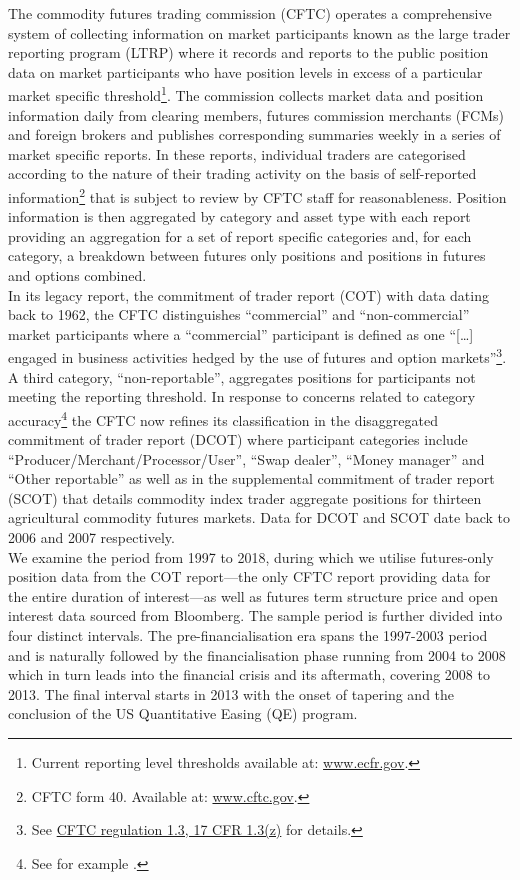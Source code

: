\documentclass[
  authoryear,
  preprint,
  3p]{elsarticle}
\begin{document}
The commodity futures trading commission (CFTC) operates a comprehensive
system of collecting information on market participants known as the
large trader reporting program (LTRP) where it records and reports to
the public position data on market participants who have position levels
in excess of a particular market specific threshold\footnote{Current
  reporting level thresholds available at:
  \href{https://www.ecfr.gov/cgi-bin/retrieveECFR?gp=&SID=970471b8455f4bab7db4110cfde50731&mc=true&r=SECTION&n=se17.1.15_103}{www.ecfr.gov}.}.
The commission collects market data and position information daily from
clearing members, futures commission merchants (FCMs) and foreign
brokers and publishes corresponding summaries weekly in a series of
market specific reports. In these reports, individual traders are
categorised according to the nature of their trading activity on the
basis of self-reported information\footnote{CFTC form 40. Available at:
  \href{https://www.cftc.gov/sites/default/files/idc/groups/public/@forms/documents/file/cftcform40.pdf}{www.cftc.gov}.}
that is subject to review by CFTC staff for reasonableness. Position
information is then aggregated by category and asset type with each
report providing an aggregation for a set of report specific categories
and, for each category, a breakdown between futures only positions and
positions in futures and options combined.\\
In its legacy report, the commitment of trader report (COT) with data
dating back to 1962, the CFTC distinguishes ``commercial'' and
``non-commercial'' market participants where a ``commercial''
participant is defined as one ``{[}\ldots{]} engaged in business
activities hedged by the use of futures and option markets''\footnote{See
  \href{https://www.gpo.gov/fdsys/pkg/CFR-1998-title17-vol1/xml/CFR-1998-title17-vol1-sec1-3.xml}{CFTC
  regulation 1.3, 17 CFR 1.3(z)} for details.}. A third category,
``non-reportable'', aggregates positions for participants not meeting
the reporting threshold. In response to concerns related to category
accuracy\footnote{See for example \citet{ederington_who_2002}.} the CFTC
now refines its classification in the disaggregated commitment of trader
report (DCOT) where participant categories include
``Producer/Merchant/Processor/User'', ``Swap dealer'', ``Money manager''
and ``Other reportable'' as well as in the supplemental commitment of
trader report (SCOT) that details commodity index trader aggregate
positions for thirteen agricultural commodity futures markets. Data for
DCOT and SCOT date back to 2006 and 2007 respectively.\\
We examine the period from 1997 to 2018, during which we utilise
futures-only position data from the COT report---the only CFTC report
providing data for the entire duration of interest---as well as futures
term structure price and open interest data sourced from Bloomberg. The
sample period is further divided into four distinct intervals. The
pre-financialisation era spans the 1997-2003 period and is naturally
followed by the financialisation phase running from 2004 to 2008 which
in turn leads into the financial crisis and its aftermath, covering 2008
to 2013. The final interval starts in 2013 with the onset of tapering
and the conclusion of the US Quantitative Easing (QE) program.
\end{document}
